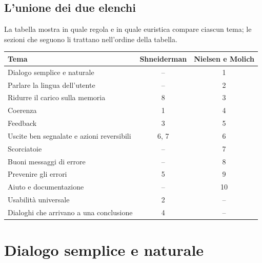 \subsection{L'unione dei due elenchi}

La tabella mostra in quale regola e in quale euristica compare ciascun tema; le sezioni che seguono li trattano
nell'ordine della tabella.

\begin{center}
\renewcommand{\arraystretch}{1.25}
\begin{tabular}{@{}lcc@{}}
  \toprule
  \textbf{Tema} & \textbf{Shneiderman} & \textbf{Nielsen e Molich} \\ \midrule
  Dialogo semplice e naturale & -- & 1 \\
  Parlare la lingua dell'utente & -- & 2 \\
  Ridurre il carico sulla memoria & 8 & 3 \\
  Coerenza & 1 & 4 \\
  Feedback & 3 & 5 \\
  Uscite ben segnalate e azioni reversibili & 6, 7 & 6 \\
  Scorciatoie & -- & 7 \\
  Buoni messaggi di errore & -- & 8 \\
  Prevenire gli errori & 5 & 9 \\
  Aiuto e documentazione & -- & 10 \\
  Usabilità universale & 2 & -- \\
  Dialoghi che arrivano a una conclusione & 4 & -- \\
  \bottomrule
\end{tabular}
\end{center}


\section{Dialogo semplice e naturale}

